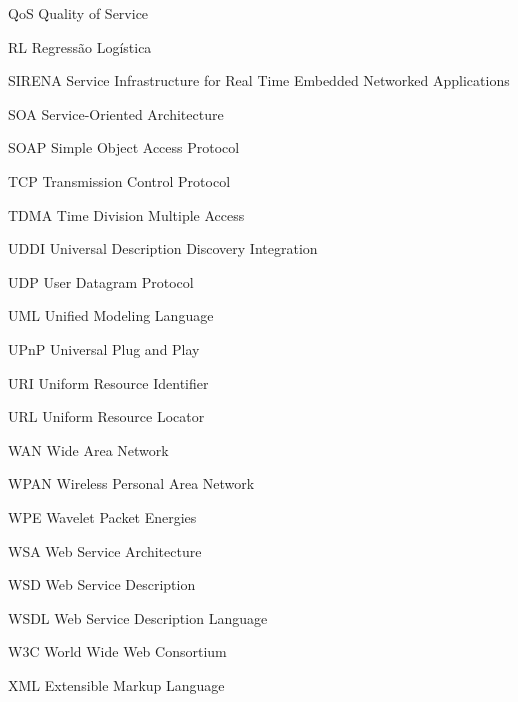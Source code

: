   {QoS}
  {Quality of Service}

  {RL}
  {Regressão Logística}

  {SIRENA}
  {Service Infrastructure for Real Time Embedded Networked Applications}

  {SOA}
  {Service-Oriented Architecture}

  {SOAP}
  {Simple Object Access Protocol}

  {TCP}
  {Transmission Control Protocol}

  {TDMA}
  {Time Division Multiple Access}

  {UDDI}
  {Universal Description Discovery Integration}

  {UDP}
  {User Datagram Protocol}

  {UML}
  {Unified Modeling Language}


  {UPnP}
  {Universal Plug and Play}

  {URI}
  {Uniform Resource Identifier}

  {URL}
  {Uniform Resource Locator}

  {WAN}
  {Wide Area Network}

  {WPAN}
  {Wireless Personal Area Network}

  {WPE}
  {Wavelet Packet Energies}

  {WSA}
  {Web Service Architecture}

  {WSD}
  {Web Service Description}

  {WSDL}
  {Web Service Description Language}

  {W3C}
  {World Wide Web Consortium}

  {XML}
  {Extensible Markup Language}
